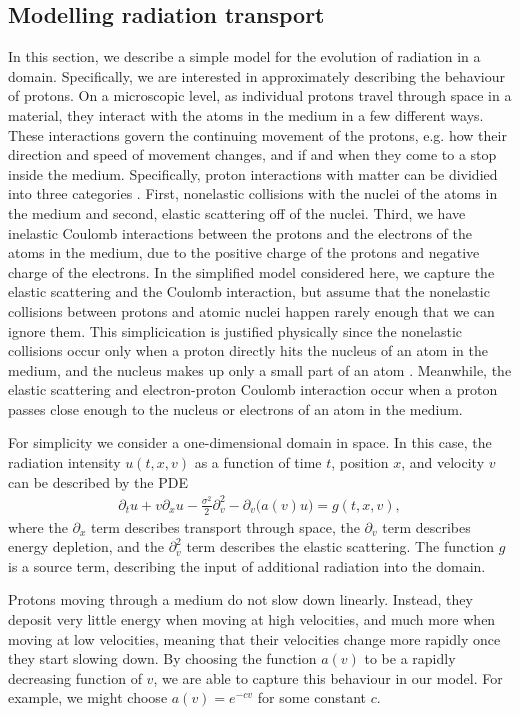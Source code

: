 \subsection{Modelling radiation transport}
In this section, we describe a simple model for the evolution of radiation in a domain. Specifically, we are interested in approximately describing the behaviour of protons. On a microscopic level, as individual protons travel through space in a material, they interact with the atoms in the medium in a few different ways. These interactions govern the continuing movement of the protons, e.g. how their direction and speed of movement changes, and if and when they come to a stop inside the medium. Specifically, proton interactions with matter can be dividied into three categories \cite{newhauser2015physics}. First, nonelastic collisions with the nuclei of the atoms in the medium and second, elastic scattering off of the nuclei. Third, we have inelastic Coulomb interactions between the protons and the electrons of the atoms in the medium, due to the positive charge of the protons and negative charge of the electrons. In the simplified model considered here, we capture the elastic scattering and the Coulomb interaction, but assume that the nonelastic collisions between protons and atomic nuclei happen rarely enough that we can ignore them. This simplicication is justified physically since the nonelastic collisions occur only when a proton directly hits the nucleus of an atom in the medium, and the nucleus makes up only a small part of an atom \cite{newhauser2015physics}. Meanwhile, the elastic scattering and electron-proton Coulomb interaction occur when a proton passes close enough to the nucleus or electrons of an atom in the medium. 

For simplicity we consider a one-dimensional domain in space. In this case, the radiation intensity $u(t,x,v)$ as a function of time $t$, position $x$, and velocity $v$ can be described by the PDE
%
\begin{align}
    \label{eq:pde-model}
    \partial_t u + v \partial_x u - \frac{\sigma^2}{2} \partial_v^2 - \partial_v \big( a(v) u\big) = g(t,x,v),
\end{align}
%
where the $\partial_x$ term describes transport through space, the $\partial_v$ term describes energy depletion, and the $\partial_v^2$ term describes the elastic scattering. The function $g$ is a source term, describing the input of additional radiation into the domain. 

Protons moving through a medium do not slow down linearly. Instead, they deposit very little energy when moving at high velocities, and much more when moving at low velocities, meaning that their velocities change more rapidly once they start slowing down. By choosing the function $a(v)$ to be a rapidly decreasing function of $v$, we are able to capture this behaviour in our model. For example, we might choose $a(v) = e^{-cv}$ for some constant $c$.

